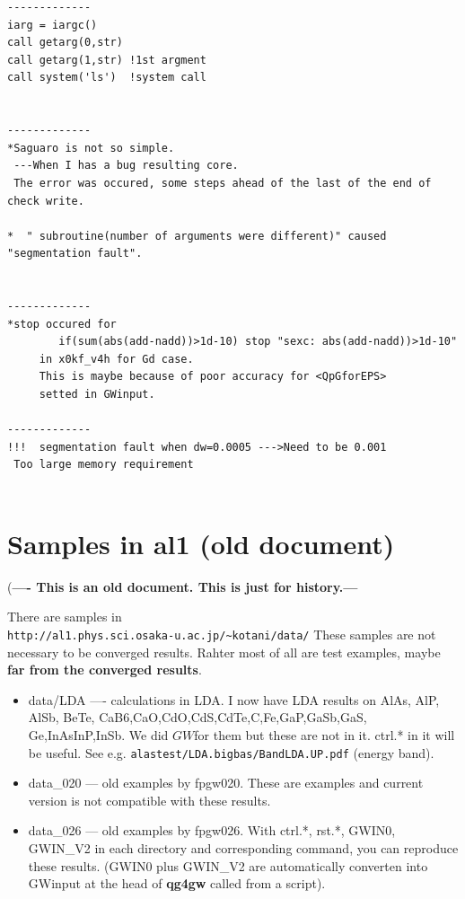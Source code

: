 \documentclass[a4paper,10pt,epsf,fleqn]{article}
\newcommand{\GW}{$GW$}
\newcommand{\exe}[1]{{\bf #1}}
\newcommand{\io}[1]{{\sf  #1}}
\begin{document}
{{{\begin{verbatim}
-------------
iarg = iargc()
call getarg(0,str)
call getarg(1,str) !1st argment
call system('ls')  !system call


-------------
*Saguaro is not so simple.
 ---When I has a bug resulting core.
 The error was occured, some steps ahead of the last of the end of check write.

*  " subroutine(number of arguments were different)" caused "segmentation fault".


-------------
*stop occured for 
        if(sum(abs(add-nadd))>1d-10) stop "sexc: abs(add-nadd))>1d-10"
     in x0kf_v4h for Gd case.
     This is maybe because of poor accuracy for <QpGforEPS>
     setted in GWinput.

-------------
!!!  segmentation fault when dw=0.0005 --->Need to be 0.001
 Too large memory requirement


\end{verbatim}



\section{Samples in al1 (old document)} 

({\bf ---- This is an old document. This is just for history.---}

There are samples in\\
\verb#http://al1.phys.sci.osaka-u.ac.jp/~kotani/data/#
These samples are not necessary to be converged results.
Rahter most of all are test examples, maybe 
{\bf far from the converged results}.
\begin{itemize}
\item 
data/LDA ---- calculations in LDA. 
I now have LDA results on AlAs, AlP, AlSb,
BeTe, CaB6,CaO,CdO,CdS,CdTe,C,Fe,GaP,GaSb,GaS,
Ge,InAsInP,InSb. We did \GW for them but these are not in it. 
ctrl.* in it will be useful. 
See e.g. \verb#alastest/LDA.bigbas/BandLDA.UP.pdf# (energy band).

\item 
data\_020 --- old examples by fpgw020. These are examples and current version 
is not compatible with these results.

\item 
data\_026 --- old examples by fpgw026.
With \io{ctrl.*, rst.*, GWIN0, GWIN\_V2} in each directory and corresponding command,
you can reproduce these results. (\io{GWIN0} plus \io{GWIN\_V2}
are automatically converten into \io{GWinput} at the head of \exe{qg4gw} called from a script).


\end{itemize}}}}
\end{document}
